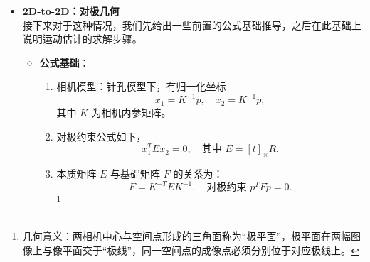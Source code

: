 \documentclass[../main.tex]{subfiles}
\begin{document}
\begin{enumerate}
\begin{itemize}
\begin{enumerate}
\begin{itemize}
\begin{itemize}
        \item \textbf{2D-to-2D：对极几何}
        \\接下来对于这种情况，我们先给出一些前置的公式基础推导，之后在此基础上说明运动估计的求解步骤。
        \begin{itemize}
            \item \textbf{公式基础}：
                \begin{enumerate}
                    \item 相机模型：针孔模型下，有归一化坐标
                    \[
                    x_1 = K^{-1} \tilde{p}, \quad x_2 = K^{-1} p,
                    \]
                    其中 $K$ 为相机内参矩阵。
                    \item 对极约束公式如下，
                    \[
                    x_1^T E x_2 = 0, \quad \text{其中 } E = [t]_\times R.
                    \]
                    \item 本质矩阵 $E$ 与基础矩阵 $F$ 的关系为：
                    \[
                    F = K^{-T} E K^{-1}, \quad \text{对极约束 } p^T F \tilde{p} = 0.
                    \]
                    \footnote{几何意义：两相机中心与空间点形成的三角面称为“极平面”，极平面在两幅图像上与像平面交于“极线”，同一空间点的成像点必须分别位于对应极线上。}
            \end{enumerate}


\end{itemize}
\end{itemize}
\end{itemize}
\end{enumerate}
\end{itemize}
\end{enumerate}
\end{document}
